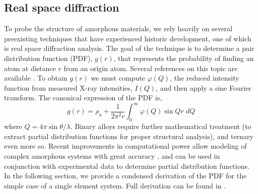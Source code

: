 \subsection{Real space diffraction}

To probe the structure of amorphous materials, we rely heavily on several preexisting techniques that have experienced historic development, one of which is real space diffraction analysis. The goal of the technique is to determine a pair distribution function (PDF), $g(r)$, that represents the probability of finding an atom at distance $r$ from an origin atom. Several references on this topic are available \cite{Billinge2003,Warren1990,Waseda1980, Farrow2009}. To obtain $g(r)$ we must compute $\varphi(Q)$, the reduced intensity function from measured X-ray intensities, $I(Q)$, and then apply a sine Fourier transform. The canonical expression of the PDF is,
\begin{equation}\label{eq:PDF}
g(r) =\rho_{a} + \frac{1}{2\pi^{2}r} \int_{0}^{\infty} \varphi(Q)\sin{Qr}\;dQ
\end{equation} 
where $Q = 4\pi \sin{\theta/\lambda}$. Binary alloys require further mathematical treatment (to extract partial distribution functions for proper structural analysis), and ternary even more so. Recent improvements in computational power allow modeling of complex amorphous systems with great accuracy \cite{Petkov1998, Bassiri2011}, and can be used in conjunction with experimental data to determine partial distribution functions. In the following section, we provide a condensed derivation of the PDF for the simple case of a single element system. Full derivation can be found in \cite{Warren1990}.  

